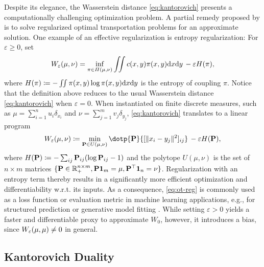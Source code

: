 Despite its elegance, the Wasserstein distance \eqref{eq:kantorovich} presents a computationally challenging optimization problem. A partial remedy proposed by \citet{cuturi2013sinkhorn} is to solve regularized optimal transportation problems for an approximate solution. One example of an effective regularization is entropy regularization: For $\varepsilon\geq0$, set 
\begin{equation} \label{eq:ot-entropy}
W_{\varepsilon}(\mu,\nu) = \inf_{\pi\in \Pi(\mu,\nu)}\iint c(x, y) \pi(x, y)\mathrm{d}x\mathrm{d}y  \,-\varepsilon H(\pi),
\end{equation}
where $H(\pi) \coloneqq - \iint \pi(x, y)\log\pi(x, y)\mathrm{d}x\mathrm{d}y$ is the entropy of coupling $\pi$. 
Notice that the definition above reduces to the usual Wasserstein distance \eqref{eq:kantorovich} when $\varepsilon=0$.
When instantiated on finite discrete measures, such as $\mu=\sum_{i=1}^n u_i\delta_{x_i}$ and $\nu=\sum_{j=1}^m v_j\delta_{y_j}$, \eqref{eq:kantorovich} translates to a linear program
\begin{equation}\label{eq:ot-reg}
\We(\mu,\nu) \defeq \min_{\bP\in U(\mu,\nu)} \dotp{\bP}{[\|x_i - y_j\|^2]_{ij}}  \,-\varepsilon H(\bP),
\end{equation}
where $H(\mathbf{P}) \coloneqq -\sum_{ij} \mathbf{P}_{ij} (\log \mathbf{P}_{ij} - 1)$ and the polytope $U(\mu,\nu)$ is the set of $n\times m$ matrices $\{\mathbf{P}\in\mathbb{R}^{n \times m}_+, \mathbf{P}\mathbf{1}_m = \mu, \mathbf{P}^\top\mathbf{1}_n=\nu\}$.
Regularization with an entropy term thereby results in a significantly more efficient optimization \citep{cuturi2013sinkhorn} and differentiability w.r.t. its inputs.
As a consequence, \ref{eq:ot-reg} is commonly used as a loss function or evaluation metric in machine learning applications, e.g., for structured prediction \citep{frogner2015learning,janati2020multi} or generative model fitting \citep{arjovsky2017wasserstein, salimans2018improving, genevay2018learning}.
While setting $\varepsilon>0$ yields a faster and differentiable proxy to approximate $W_{0}$, however, it introduces a bias, since $W_{\varepsilon}(\mu,\mu)\ne 0$ in general.

\subsection{Kantorovich Duality} \label{sec:background_dual}

